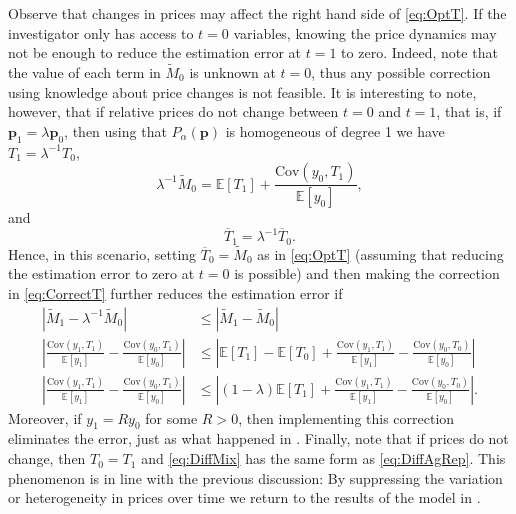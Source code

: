 \documentclass[english, a4paper, 12pt]{article}
\begin{document}
Observe that changes in prices may affect the right hand side of \eqref{eq:OptT}. If the investigator only has access to $t =0$ variables, knowing the price dynamics may not be enough to reduce the estimation error at $t =1$ to zero. Indeed, note that the value of each term in $\tilde{M}_{0}$ is unknown at $t=0$, thus any possible correction using knowledge about price changes is not feasible. It is interesting to note, however, that if relative prices do not change between $t=0$ and $t=1$, that is, if $\mathbf{p}_{1} = \lambda \mathbf{p}_{0}$, then using that $P_{\alpha}(\mathbf{p})$ is homogeneous of degree 1 we have $T_{1} = \lambda^{-1}T_{0}$,
	$$\lambda^{-1}\tilde{M}_{0} = \mathbb{E}[T_{1}] + \frac{\mathrm{Cov}\left(y_{0}, T_{1} \right)}{\mathbb{E}[y_{0}]},$$
and
	\begin{equation} \label{eq:CorrectT}
		\overline{T}_{1} = \lambda^{-1}\overline{T}_{0}.
	\end{equation}
Hence, in this scenario, setting $\overline{T}_{0} = \tilde{M}_{0}$ as in \eqref{eq:OptT} (assuming that reducing the estimation error to zero at $t=0$ is possible) and then making the correction in \eqref{eq:CorrectT} further reduces the estimation error if
	\begin{align*}
		\left|\tilde{M}_{1} - \lambda^{-1}\tilde{M}_{0} \right|
			&\leq \left|\tilde{M}_{1} - \tilde{M}_{0} \right|	\\
		\left| \frac{\mathrm{Cov}\left(y_{1}, T_{1} \right)}{\mathbb{E}[y_{1}]} - \frac{\mathrm{Cov}\left(y_{0}, T_{1} \right)}{\mathbb{E}[y_{0}]} \right|
			&\leq \left| \mathbb{E}\left[T_{1} \right] - \mathbb{E}\left[T_{0} \right] + \frac{\mathrm{Cov}\left(y_{1}, T_{1} \right)}{\mathbb{E}[y_{1}]} - \frac{\mathrm{Cov}\left(y_{0}, T_{0} \right)}{\mathbb{E}[y_{0}]} \right|	\\
		\left| \frac{\mathrm{Cov}\left(y_{1}, T_{1} \right)}{\mathbb{E}[y_{1}]} - \frac{\mathrm{Cov}\left(y_{0}, T_{1} \right)}{\mathbb{E}[y_{0}]} \right|
			&\leq \left| (1-\lambda)\mathbb{E}\left[T_{1} \right] + \frac{\mathrm{Cov}\left(y_{1}, T_{1} \right)}{\mathbb{E}[y_{1}]} - \frac{\mathrm{Cov}\left(y_{0}, T_{0} \right)}{\mathbb{E}[y_{0}]} \right|.
	\end{align*}
\newpage \noindent
Moreover, if $y_{1} = Ry_{0}$ for some $R>0$, then implementing this correction eliminates the error, just as what happened in . Finally, note that if prices do not change, then $T_{0} = T_{1}$ and \eqref{eq:DiffMix} has the same form as \eqref{eq:DiffAgRep}. This phenomenon is in line with the previous discussion: By suppressing the variation or heterogeneity in prices over time we return to the results of the model in .
\end{document}
